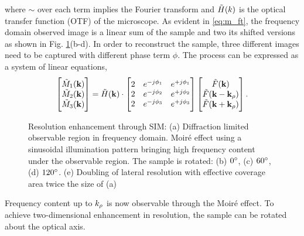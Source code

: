 \documentclass[11pt]{article}
\begin{document}
where $\sim$ over each term implies the Fourier transform and $\tilde{H}(k)$ is the optical transfer function (OTF) of the microscope. As evident in \eqref{eq:m_ft}, the frequency domain observed image is a linear sum of the sample and two its shifted versions as shown in Fig. \ref{fig:sim}(b-d).  In order to reconstruct the sample, three different images need to be captured with different phase term $\phi$. The process can be expressed as a system of linear equations,
%
\begin{equation}
  \begin{bmatrix}
   \tilde{M}_1(\mathbf{k}) \\
   \tilde{M}_2(\mathbf{k}) \\
   \tilde{M}_3(\mathbf{k})
  \end{bmatrix}
  = \tilde{H}(\mathbf{k}) \cdot
  \begin{bmatrix}
    2 & e^{-j \phi_1} & e^{+j \phi_1} \\
    2 & e^{-j \phi_2} & e^{+j \phi_2} \\
    2 & e^{-j \phi_3} & e^{+j \phi_3} \\
  \end{bmatrix}
  \begin{bmatrix}
    \tilde{F}(\mathbf{k}) \\
    \tilde{F}(\mathbf{k} - \mathbf{k}_{\rho}) \\
    \tilde{F}(\mathbf{k} + \mathbf{k}_{\rho})
  \end{bmatrix}.
  \label{eq:reconstruction_algo}
\end{equation}
%
\begin{figure}[t!]
  \def\svgwidth{\linewidth}
  
  \caption{Resolution enhancement through SIM: (a) Diffraction limited observable region in frequency domain.  Moiré effect using a sinusoidal illumination pattern bringing high frequency content under the observable region. The sample is rotated: (b) $0 \degree$, (c) $60 \degree$, (d) $120 \degree$. (e) Doubling of lateral resolution with effective coverage area twice the size of (a)}
  \label{fig:sim}
\end{figure}
%
Frequency content up to $k_{\rho}$ is now observable through the Moiré effect. To achieve two-dimensional enhancement in resolution, the sample can be rotated about the optical axis.

















\clearpage %


\end{document}
